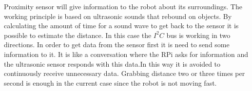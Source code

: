 Proximity sensor will give information to the robot about its surroundings. The working principle is based on ultrasonic sounds that rebound on objects. By calculating the amount of time for a sound wave to get back to the sensor it is possible to estimate the distance. In this case the $I^{2}C$ bus is working in two directions. In order to get data from the sensor first it is need to send some information to it. It is like a conversation where the RPi asks for information and the ultrasonic sensor responds with this data.In this way it is avoided to continuously receive unnecessary data. Grabbing distance two or three times per second is enough in the current case since the robot is not moving fast.
